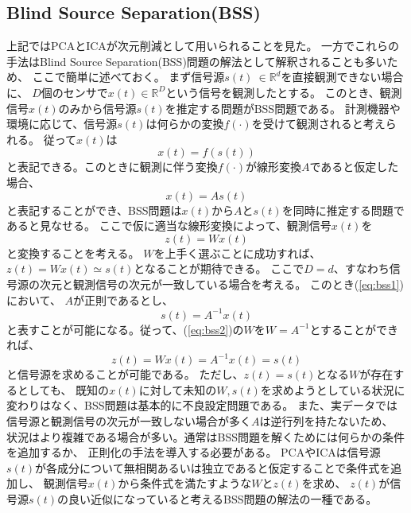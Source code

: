 \subsection{Blind Source Separation(BSS)}
上記ではPCAとICAが次元削減として用いられることを見た。
一方でこれらの手法はBlind Source Separation(BSS)問題の解法として解釈されることも多いため、
ここで簡単に述べておく。
まず信号源\(s(t)\ \in \mathbb R^d\)を直接観測できない場合に、
\(D\)個のセンサで\(x(t) \in \mathbb R^D\)という信号を観測したとする。
このとき、観測信号\(x(t)\)のみから信号源\(s(t)\)を推定する問題がBSS問題である。
計測機器や環境に応じて、信号源\(s(t)\)は何らかの変換\(f(\cdot)\)を受けて観測されると考えられる。
従って\(x(t)\)は
\begin{equation}
    x(t)=f(s(t))
\end{equation}
と表記できる。このときに観測に伴う変換\(f(\cdot)\)が線形変換\(A\)であると仮定した場合、
\begin{equation}
    x(t)=As(t)
    \label{eq:bss1}
\end{equation}
と表記することができ、BSS問題は\(x(t)\)から\(A\)と\(s(t)\)を同時に推定する問題であると見なせる。
ここで仮に適当な線形変換によって、観測信号\(x(t)\)を
\begin{equation}
    z(t)=Wx(t)
    \label{eq:bss2}
\end{equation}
と変換することを考える。
\(W\)を上手く選ぶことに成功すれば、\(z(t)=Wx(t) \simeq s(t)\)となることが期待できる。
ここで\(D=d\)、すなわち信号源の次元と観測信号の次元が一致している場合を考える。
このとき(\ref{eq:bss1})において、
\(A\)が正則であるとし、
\begin{equation}
    s(t)=A^{-1}x(t)
\end{equation}
と表すことが可能になる。従って、(\ref{eq:bss2})の\(W\)を\(W=A^{-1}\)とすることができれば、
\begin{equation}
    z(t)=Wx(t)=A^{-1}x(t)=s(t)
\end{equation}
と信号源を求めることが可能である。
ただし、\(z(t)=s(t)\)となる\(W\)が存在するとしても、
既知の\(x(t)\)に対して未知の\(W,s(t)\)を求めようとしている状況に変わりはなく、BSS問題は基本的に不良設定問題である。
また、実データでは信号源と観測信号の次元が一致しない場合が多く\(A\)は逆行列を持たないため、
状況はより複雑である場合が多い。通常はBSS問題を解くためには何らかの条件を追加するか、
正則化の手法を導入する必要がある。
PCAやICAは信号源\(s(t)\)が各成分について無相関あるいは独立であると仮定することで条件式を追加し、
観測信号\(x(t)\)から条件式を満たすような\(W\)と\(z(t)\)を求め、
\(z(t)\)が信号源\(s(t)\)の良い近似になっていると考えるBSS問題の解法の一種である。


